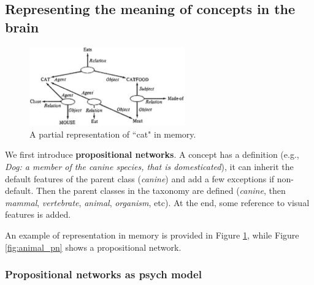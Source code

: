 \subsection{Representing the meaning of concepts in the brain}

\begin{figure}
  \centering
  \includegraphics[width=0.6\textwidth]{images/cat_pn.png}
  \caption{A partial representation of ``cat" in memory.}
  \label{fig:cat_pn}
\end{figure}

We first introduce \textbf{propositional networks}.
A concept has a definition (e.g., \textit{Dog: a member of the canine species, that is domesticated}), it can inherit the default features of the parent class (\textit{canine}) and add a few exceptions if non-default. 
Then the parent classes in the taxonomy are defined (\textit{canine}, then \textit{mammal}, \textit{vertebrate}, \textit{animal}, \textit{organism}, etc).
At the end, some reference to visual features is added.

An example of representation in memory is provided in Figure \ref{fig:cat_pn}, while Figure \ref{fig:animal_pn} shows a propositional network.

\subsubsection{Propositional networks as psych model}

